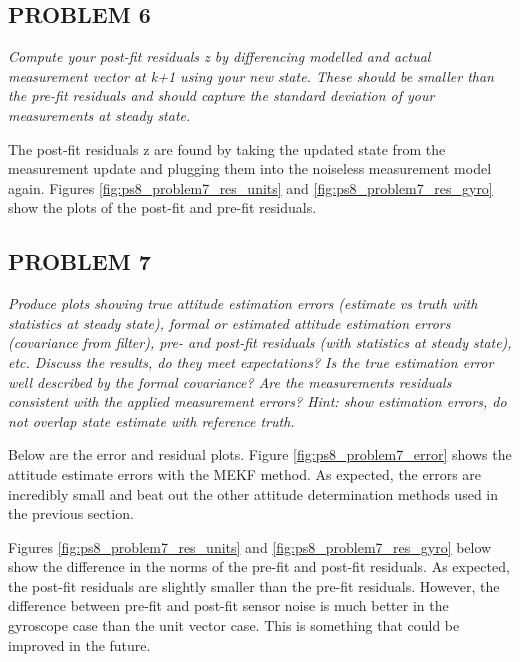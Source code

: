 \subsection{PROBLEM 6}
\textit{Compute your post-fit residuals z by differencing modelled and actual measurement vector at k+1 using your new state. These should be smaller than the pre-fit residuals and should capture the standard deviation of your measurements at steady state.}

The post-fit residuals z are found by taking the updated state from the measurement update and plugging them into the noiseless measurement model again. Figures \ref{fig:ps8_problem7_res_units} and \ref{fig:ps8_problem7_res_gyro} show the plots of the post-fit and pre-fit residuals.

\subsection{PROBLEM 7}
\textit{Produce plots showing true attitude estimation errors (estimate vs truth with statistics at steady state), formal or estimated attitude estimation errors (covariance from filter), pre- and post-fit residuals (with statistics at steady state), etc. Discuss the results, do they meet expectations? Is the true estimation error well described by the formal covariance? Are the measurements residuals consistent with the applied measurement errors? Hint: show estimation errors, do not overlap state estimate with reference truth.}

Below are the error and residual plots. Figure \ref{fig:ps8_problem7_error} shows the attitude estimate errors with the MEKF method. As expected, the errors are incredibly small and beat out the other attitude determination methods used in the previous section.



Figures \ref{fig:ps8_problem7_res_units} and \ref{fig:ps8_problem7_res_gyro} below show the difference in the norms of the pre-fit and post-fit residuals. As expected, the post-fit residuals are slightly smaller than the pre-fit residuals. However, the difference between pre-fit and post-fit sensor noise is much better in the gyroscope case than the unit vector case. This is something that could be improved in the future.

